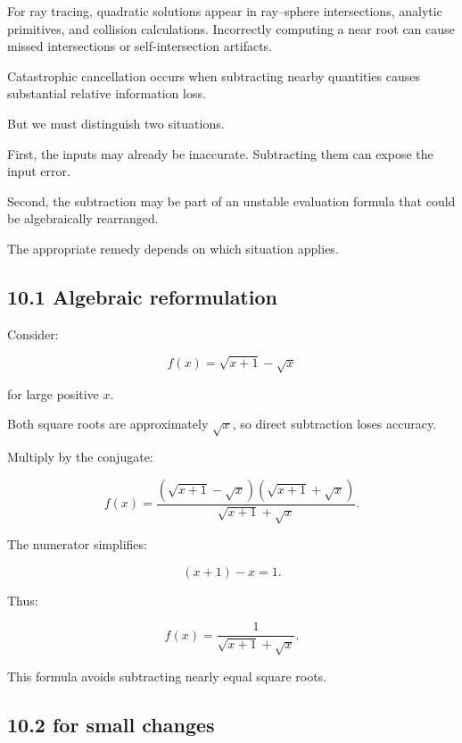 For ray tracing, quadratic solutions appear in ray--sphere intersections, analytic primitives, and collision calculations. Incorrectly computing a near root can cause missed intersections or self-intersection artifacts.

Catastrophic cancellation occurs when subtracting nearby quantities causes substantial relative information loss.

But we must distinguish two situations.

First, the inputs may already be inaccurate. Subtracting them can expose the input error.

Second, the subtraction may be part of an unstable evaluation formula that could be algebraically rearranged.

The appropriate remedy depends on which situation applies.

\subsection{10.1 Algebraic reformulation}\label{02-foundations-ii-ch028-algebraic-reformulation}

\hypertarget{02-foundations-ii-ch028-algebraic-reformulation}{}

Consider:

\[ f(x)=\sqrt{x+1}-\sqrt x \]

for large positive \(x\).

Both square roots are approximately \(\sqrt x\), so direct subtraction loses accuracy.

Multiply by the conjugate:

\[ f(x)= \frac{ (\sqrt{x+1}-\sqrt x)(\sqrt{x+1}+\sqrt x) }{ \sqrt{x+1}+\sqrt x }. \]

The numerator simplifies:

\[ (x+1)-x=1. \]

Thus:

\[ \boxed{ f(x)= \frac1{\sqrt{x+1}+\sqrt x} }. \]

This formula avoids subtracting nearly equal square roots.

\subsection{\texorpdfstring{10.2  for small changes}{10.2  for small changes}}\label{02-foundations-ii-ch028-log1p-for-small-changes}

\hypertarget{02-foundations-ii-ch028-log1p-for-small-changes}{}

